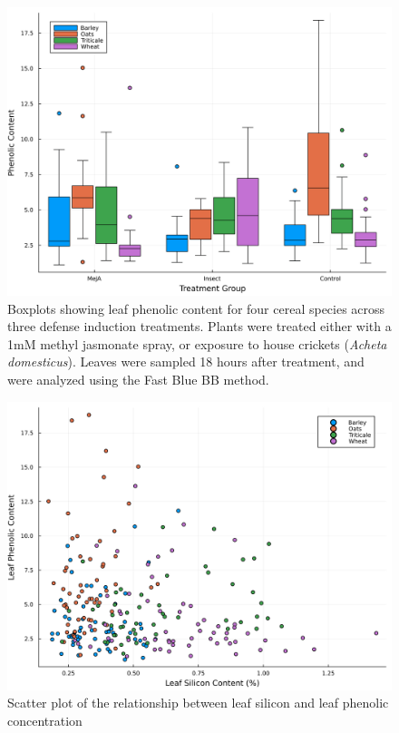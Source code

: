 \documentclass[12pt, letterpaper, ]{report}
\begin{document}
\begin{figure}[h]
        \includegraphics[width = \textwidth]{images/absorbance_boxplots.png}
        \centering
        \caption{Boxplots showing leaf phenolic content for four cereal species across three defense induction treatments. Plants were treated either with a 1mM methyl jasmonate spray, or exposure to house crickets (\textit{Acheta domesticus}). Leaves were sampled 18 hours after treatment, and were analyzed using the Fast Blue BB method.}
        \label{Fig:absorbance_boxplots}
\end{figure}

\begin{figure}[h]
        \includegraphics[width = \textwidth]{images/phenolic_silicon_regression.png}
        \centering
        \caption{Scatter plot of the relationship between leaf silicon and leaf phenolic concentration}
        \label{Fig:phe_si_scatter}
\end{figure}
\end{document}
